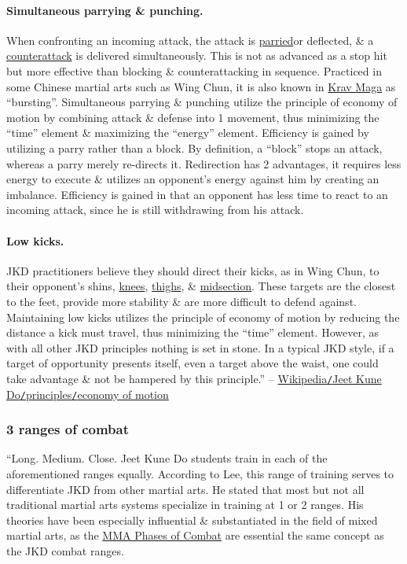 \documentclass[oneside]{book}
\numberwithin{equation}{section}
\begin{document}
\paragraph{Simultaneous parrying \& punching.} When confronting an incoming attack, the attack is \href{https://en.wikipedia.org/wiki/Parried}{parried}or deflected, \& a \href{https://en.wikipedia.org/wiki/Counterattack}{counterattack} is delivered simultaneously. This is not as advanced as a stop hit but more effective than blocking \& counterattacking in sequence. Practiced in some Chinese martial arts such as Wing Chun, it is also known in \href{https://en.wikipedia.org/wiki/Krav_Maga}{Krav Maga} as ``bursting''. Simultaneous parrying \& punching utilize the principle of economy of motion by combining attack \& defense into 1 movement, thus minimizing the ``time'' element \& maximizing the ``energy'' element. Efficiency is gained by utilizing a parry rather than a block. By definition, a ``block'' stops an attack, whereas a parry merely re-directs it. Redirection has 2 advantages, it requires less energy to execute \& utilizes an opponent's energy against him by creating an imbalance. Efficiency is gained in that an opponent has less time to react to an incoming attack, since he is still withdrawing from his attack.

\paragraph{Low kicks.} JKD practitioners believe they should direct their kicks, as in Wing Chun, to their opponent's shins, \href{https://en.wikipedia.org/wiki/Knees}{knees}, \href{https://en.wikipedia.org/wiki/Thighs}{thighs}, \& \href{https://en.wikipedia.org/wiki/Midsection}{midsection}. These targets are the closest to the feet, provide more stability \& are more difficult to defend against. Maintaining low kicks utilizes the principle of economy of motion by reducing the distance a kick must travel, thus minimizing the ``time'' element. However, as with all other JKD principles nothing is set in stone. In a typical JKD style, if a target of opportunity presents itself, even a target above the waist, one could take advantage \& not be hampered by this principle.'' -- \href{https://en.wikipedia.org/wiki/Jeet_Kune_Do#Economy_of_motion}{Wikipedia\texttt{/}Jeet Kune Do\texttt{/}principles\texttt{/}economy of motion}

\subsubsection{3 ranges of combat}
``Long. Medium. Close. Jeet Kune Do students train in each of the aforementioned ranges equally. According to Lee, this range of training serves to differentiate JKD from other martial arts. He stated that most but not all traditional martial arts systems specialize in training at 1 or 2 ranges. His theories have been especially influential \& substantiated in the field of mixed martial arts, as the \href{https://en.wikipedia.org/wiki/Mixed_martial_arts#Phases_of_combat}{MMA Phases of Combat} are essential the same concept as the JKD combat ranges.
\end{document}
